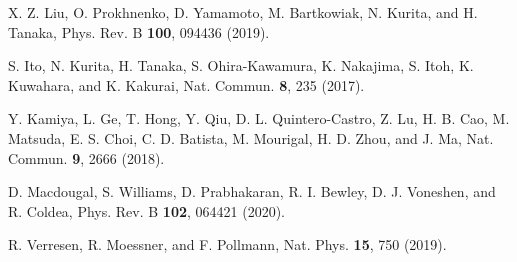 \documentclass[aps,twocolumn,superscriptaddress,showpacs]{revtex4-1}
\begin{document}
\begin{thebibliography}{}
X. Z. Liu, O. Prokhnenko, D. Yamamoto, M. Bartkowiak, N. Kurita, and H. Tanaka, Phys. Rev. B {\bf 100}, 094436 (2019).

S. Ito, N. Kurita, H. Tanaka, S. Ohira-Kawamura, K. Nakajima, S. Itoh, K. Kuwahara, and K. Kakurai, Nat. Commun. {\bf 8}, 235 (2017).

Y. Kamiya, L. Ge, T. Hong, Y. Qiu, D. L. Quintero-Castro, Z. Lu, H. B. Cao, M. Matsuda, E. S. Choi, C. D. Batista, M. Mourigal, H. D. Zhou, and J. Ma, Nat. Commun. {\bf 9}, 2666 (2018).

D. Macdougal, S. Williams, D. Prabhakaran, R. I. Bewley, D. J. Voneshen, and R. Coldea, Phys. Rev. B {\bf 102}, 064421 (2020).

R. Verresen, R. Moessner, and F. Pollmann, Nat. Phys. {\bf 15}, 750 (2019).

\end{thebibliography}
\end{document}
